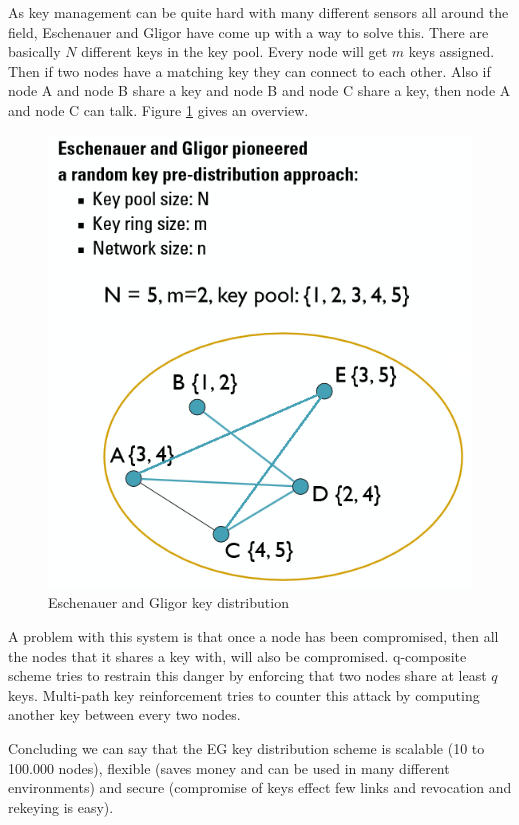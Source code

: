 \documentclass{article}
\begin{document}
As key management can be quite hard with many different sensors all around the field, Eschenauer and Gligor have come up with a way to solve this. There are basically $N$ different keys in the key pool. Every node will get $m$ keys assigned. Then if two nodes have a matching key they can connect to each other. Also if node A and node B share a key and node B and node C share a key, then node A and node C can talk. Figure \ref{fig:egkeydistribution} gives an overview. 

\begin{figure}[!h]
\centering
\includegraphics[width=\textwidth, height=\textheight, keepaspectratio]{images/eg_keydistribution.png}
\caption{Eschenauer and Gligor key distribution}
\label{fig:egkeydistribution}
\end{figure}

A problem with this system is that once a node has been compromised, then all the nodes that it shares a key with, will also be compromised. q-composite scheme tries to restrain this danger by enforcing that two nodes share at least $q$ keys. Multi-path key reinforcement tries to counter this attack by computing another key between every two nodes.

Concluding we can say that the EG key distribution scheme is scalable (10 to 100.000 nodes), flexible (saves money and can be used in many different environments) and secure (compromise of keys effect few links and revocation and rekeying is easy).
\end{document}
